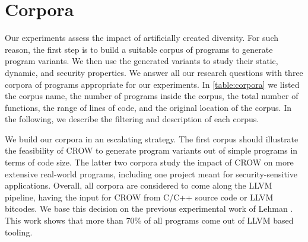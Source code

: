 

\section{Corpora}
\label{section:crow:corpora}

Our experiments assess the impact of artificially created diversity. For such reason, the first step is to build a suitable corpus of programs to generate program variants. We then use the generated variants to study their static, dynamic, and security properties.  We answer all our research questions with three corpora of programs appropriate for our experiments. In \autoref{table:corpora} we listed the corpus name, the number of programs inside the corpus, the total number of functions, the range of lines of code, and the original location of the corpus. In the following, we describe the filtering and description of each corpus.

We build our corpora in an escalating strategy. The first corpus should illustrate the feasibility of CROW to generate program variants out of simple programs in terms of code size. The latter two corpora study the impact of CROW on more extensive real-world programs, including one project meant for security-sensitive applications. Overall, all corpora are considered to come along the LLVM pipeline, having the input for CROW from C/C++ source code or LLVM bitcodes. We base this decision on the previous experimental work of Lehman \etal \citationneeded. This work shows that more than 70\% of all \wasm programs come out of LLVM based tooling.

